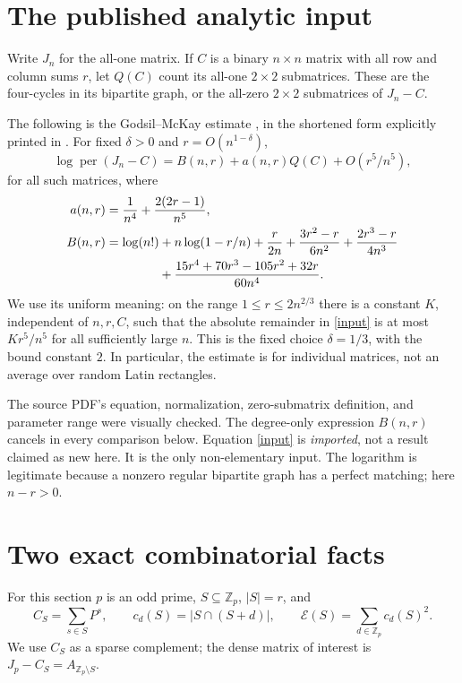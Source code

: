 \documentclass[11pt,a4paper]{article}
\newcommand{\per}{\operatorname{per}}
\newcommand{\Z}{\mathbb Z}
\begin{document}
\section{The published analytic input}
Write $J_n$ for the all-one matrix. If $C$ is a binary $n\times n$ matrix with all row and column sums $r$, let $Q(C)$ count its all-one $2\times2$ submatrices. These are the four-cycles in its bipartite graph, or the all-zero $2\times2$ submatrices of $J_n-C$.

The following is the Godsil--McKay estimate \cite{GM}, in the shortened form explicitly printed in \cite[p.~321, equation (5)]{CW}. For fixed $\delta>0$ and $r=O(n^{1-\delta})$,
\begin{equation}\label{input}
 \log\per(J_n-C)=B(n,r)+a(n,r)Q(C)+O(r^5/n^5),
\end{equation}
for all such matrices, where
\begin{align}
 a(n,r)&=\frac1{n^4}+\frac{2(2r-1)}{n^5},\label{coef}\\
 B(n,r)&=\log(n!)+n\log(1-r/n)+\frac r{2n}
 +\frac{3r^2-r}{6n^2}+\frac{2r^3-r}{4n^3}\notag\\
 &\hspace{15mm}+\frac{15r^4+70r^3-105r^2+32r}{60n^4}.\label{base}
\end{align}
We use its uniform meaning: on the range $1\le r\le2n^{2/3}$ there is a constant $K$, independent of $n,r,C$, such that the absolute remainder in \eqref{input} is at most $Kr^5/n^5$ for all sufficiently large $n$. This is the fixed choice $\delta=1/3$, with the bound constant $2$. In particular, the estimate is for individual matrices, not an average over random Latin rectangles.

The source PDF's equation, normalization, zero-submatrix definition, and parameter range were visually checked. The degree-only expression $B(n,r)$ cancels in every comparison below. Equation \eqref{input} is \emph{imported}, not a result claimed as new here. It is the only non-elementary input. The logarithm is legitimate because a nonzero regular bipartite graph has a perfect matching; here $n-r>0$.

\section{Two exact combinatorial facts}
For this section $p$ is an odd prime, $S\subseteq\Z_p$, $|S|=r$, and
\[
 C_S=\sum_{s\in S}P^s,\qquad
 c_d(S)=|S\cap(S+d)|,\qquad
 \mathcal E(S)=\sum_{d\in\Z_p}c_d(S)^2.
\]
We use $C_S$ as a sparse complement; the dense matrix of interest is $J_p-C_S=A_{\Z_p\setminus S}$.
\end{document}
